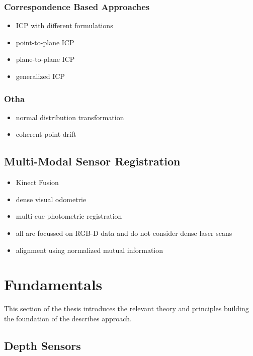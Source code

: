 \subsubsection{Correspondence Based Approaches}
\begin{itemize}
    \item ICP with different formulations
    \item point-to-plane ICP
    \item plane-to-plane ICP
    \item generalized ICP
\end{itemize}

\subsubsection{Otha}
\begin{itemize}
    \item normal distribution transformation
    \item coherent point drift
\end{itemize}

\subsection{Multi-Modal Sensor Registration}

\begin{itemize}
    \item Kinect Fusion\cite{newcombe_ismar2011}
    \item dense visual odometrie\cite{kerl_icra2013}
    \item multi-cue photometric registration\cite{corte_2017}
    \item all are focussed on RGB-D data and do not consider dense laser scans
    \item alignment using normalized mutual information
\end{itemize}

\section{Fundamentals}

This section of the thesis introduces the relevant theory and principles building the foundation of the describes approach.

\subsection{Depth Sensors}

